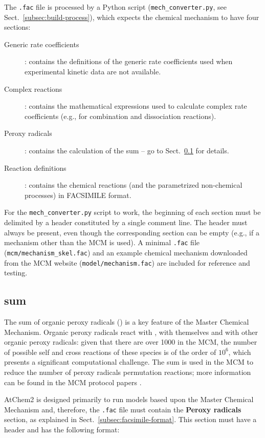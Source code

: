The \texttt{.fac} file is processed by a Python script
(\texttt{mech\_converter.py}, see Sect.~\ref{subsec:build-process}),
which expects the chemical mechanism to have four sections:

\begin{description}
\item[Generic rate coefficients] : contains the definitions of the
  generic rate coefficients used when experimental kinetic data are
  not available.
\item[Complex reactions] : contains the mathematical expressions used
  to calculate complex rate coefficients (e.g., for combination and
  dissociation reactions).
\item[Peroxy radicals] : contains the calculation of the  sum
  -- go to Sect.~\ref{subsec:ro2-sum} for details.
\item[Reaction definitions] : contains the chemical reactions (and the
  parametrized non-chemical processes) in FACSIMILE format.
\end{description}

For the \texttt{mech\_converter.py} script to work, the beginning of each
section must be delimited by a header constituted by a single comment
line.  The header must always be present, even though the corresponding
section can be empty (e.g., if a mechanism other than the MCM is used).
A minimal \texttt{.fac} file (\texttt{mcm/mechanism\_skel.fac})
and an example chemical mechanism downloaded from the MCM website
(\texttt{model/mechanism.fac}) are included for reference and testing.

\subsection{ sum} \label{subsec:ro2-sum}

The sum of organic peroxy radicals () is a key feature of the
Master Chemical Mechanism. Organic peroxy radicals react with
, with themselves and with other organic peroxy radicals:
given that there are over 1000  in the MCM, the number of
possible self and cross reactions of these species is of the order of
$10^6$, which presents a significant computational challenge. The
 sum is used in the MCM to reduce the number of peroxy
radicals permutation reactions; more information can be found in the
MCM protocol papers \citep{jenkin_1997, saunders_2003}.

AtChem2 is designed primarily to run models based upon the Master
Chemical Mechanism and, therefore, the \texttt{.fac} file must contain
the \textbf{Peroxy radicals} section, as explained in
Sect.~\ref{subsec:facsimile-format}. This section must have a header
and has the following format:

